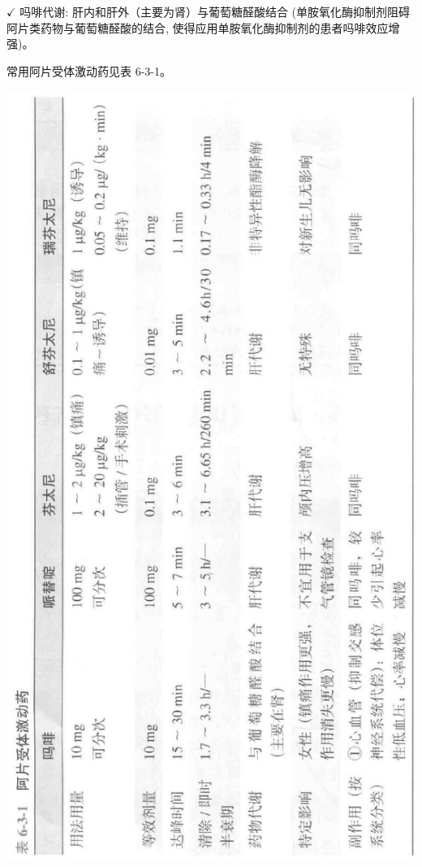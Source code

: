 \documentclass[10pt]{article}
\begin{document}
$\checkmark$ 吗啡代谢: 肝内和肝外（主要为肾）与葡萄糖醛酸结合 (单胺氧化酶抑制剂阻碍阿片类药物与葡萄糖醛酸的结合, 使得应用单胺氧化酶抑制剂的患者吗啡效应增强)。

常用阿片受体激动药见表 6-3-1。

\begin{center}
\includegraphics[max width=\textwidth]{2024_07_05_645bb794a4d4f32ee0c8g-330}
\end{center}
\end{document}
